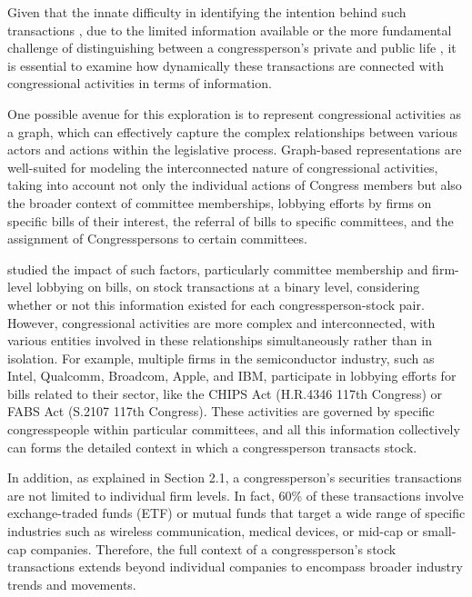 \documentclass[15pt,letterpaper]{article}
\begin{document}
Given that the innate difficulty in identifying the intention behind such transactions \citep{zi11,zi24, eg13, eg14}, due to the limited information available or the more fundamental challenge of distinguishing between a congressperson's private and public life \citep{buchanan1984}, it is essential to examine how dynamically these transactions are connected with congressional activities in terms of information. 

One possible avenue for this exploration is to represent congressional activities as a graph, which can effectively capture the complex relationships between various actors and actions \citep{g1, g2} within the legislative process. Graph-based representations are well-suited for modeling the interconnected nature of congressional activities, taking into account not only the individual actions of Congress members but also the broader context of committee memberships, lobbying efforts by firms on specific bills of their interest, the referral of bills to specific committees, and the assignment of Congresspersons to certain committees.

\cite{eg14} studied the impact of such factors, particularly committee membership and firm-level lobbying on bills,  on stock transactions at a binary level, considering whether or not this information existed for each congressperson-stock pair. However, congressional activities are more complex and interconnected, with various entities involved in these relationships simultaneously rather than in isolation. For example, multiple firms in the semiconductor industry, such as Intel, Qualcomm, Broadcom, Apple, and IBM, participate in lobbying efforts for bills related to their sector, like the CHIPS Act (H.R.4346 117th Congress) or FABS Act (S.2107 117th Congress). These activities are governed by specific congresspeople within particular committees, and all this information collectively can forms the detailed context in which a congressperson transacts stock.

In addition, as explained in Section 2.1, a congressperson's securities transactions are not limited to individual firm levels. In fact, 60\% of these transactions involve exchange-traded funds (ETF) or mutual funds that target a wide range of specific industries such as wireless communication, medical devices, or mid-cap or small-cap companies. Therefore, the full context of a congressperson's stock transactions extends beyond individual companies to encompass broader industry trends and movements.
\end{document}
